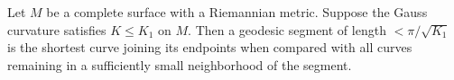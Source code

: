 Let $M$ be a complete surface with a Riemannian metric. Suppose the Gauss curvature satisfies $K \leq K_1$ on $M$. Then a geodesic segment of length $< \pi/\sqrt{K_1}$ is the shortest curve joining its endpoints when compared with all curves remaining in a sufficiently small neighborhood of the segment.

